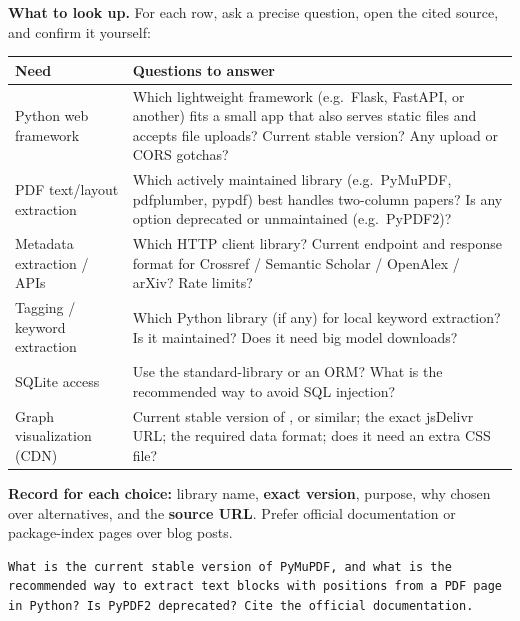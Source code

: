 \documentclass[11pt,a4paper]{article}
\newcommand{\fn}[1]{\texttt{\detokenize{#1}}}
\begin{document}
\textbf{What to look up.} For each row, ask a precise question, open the cited source, and confirm it yourself:
\begin{center}
\begin{tabularx}{\textwidth}{@{}p{3.6cm}L@{}}
\toprule
\textbf{Need} & \textbf{Questions to answer}\\
\midrule
Python web framework & Which lightweight framework (e.g.\ Flask, FastAPI, or another) fits a small app that also serves static files and accepts file uploads? Current stable version? Any upload or CORS gotchas?\\
PDF text/layout extraction & Which actively maintained library (e.g.\ PyMuPDF, pdfplumber, pypdf) best handles two-column papers? Is any option deprecated or unmaintained (e.g.\ PyPDF2)?\\
Metadata extraction / APIs & Which HTTP client library? Current endpoint and response format for Crossref / Semantic Scholar / OpenAlex / arXiv? Rate limits?\\
Tagging / keyword extraction & Which Python library (if any) for local keyword extraction? Is it maintained? Does it need big model downloads?\\
SQLite access & Use the standard-library \fn{sqlite3} or an ORM? What is the recommended way to avoid SQL injection?\\
Graph visualization (CDN) & Current stable version of \fn{vis-network}, \fn{cytoscape.js} or similar; the exact jsDelivr URL; the required data format; does it need an extra CSS file?\\
\bottomrule
\end{tabularx}
\end{center}

\textbf{Record for each choice:} library name, \textbf{exact version}, purpose, why chosen over alternatives, and the \textbf{source URL}. Prefer official documentation or package-index pages over blog posts.

\begin{tipbox}
\begin{lstlisting}[frame=none,backgroundcolor=\color{white},xleftmargin=0pt]
What is the current stable version of PyMuPDF, and what is the
recommended way to extract text blocks with positions from a PDF page
in Python? Is PyPDF2 deprecated? Cite the official documentation.
\end{lstlisting}
\end{tipbox}

\end{document}
